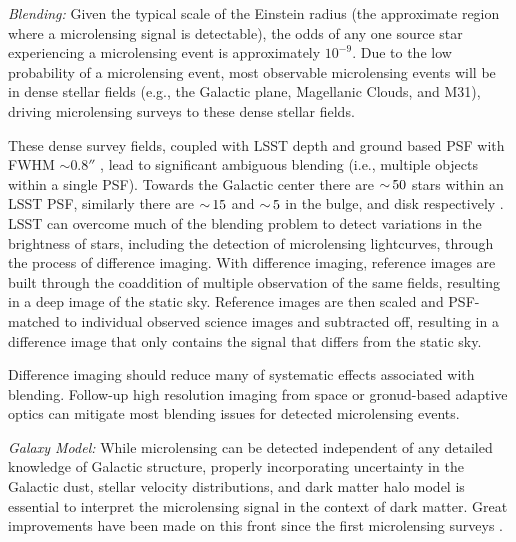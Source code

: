\emph{Blending:} Given the typical scale  of the Einstein radius (the approximate region where a microlensing signal is detectable), the odds of any one source star experiencing a microlensing event is approximately $10^{-9}$. Due to the low probability of a microlensing event, most observable microlensing events will be in dense stellar fields (e.g., the Galactic plane, Magellanic Clouds, and M31), driving microlensing surveys to these dense stellar fields.

These dense survey fields, coupled with LSST depth and ground based PSF with FWHM $\sim 0.8''$ \citep{0805.2366}, lead to significant ambiguous blending (i.e., multiple objects within a single PSF).
Towards the Galactic center there are $ {\sim}\, 50$ stars within an LSST PSF, similarly there are $ {\sim}\, 15$ and $ {\sim}\, 5$ in the bulge, and disk respectively \citep{1806.06372}.
LSST can overcome much of the blending problem to detect variations in the brightness of stars, including the detection of microlensing lightcurves, through the process of difference imaging.
With difference imaging, reference images are built through the coaddition of multiple observation of the same fields, resulting in a deep image of the static sky. Reference images are then scaled and PSF-matched to individual observed science images and subtracted off, resulting in a difference image that only contains the signal that differs from the static sky. 

Difference imaging should reduce many of systematic effects associated with blending. Follow-up high resolution imaging from space or gronud-based adaptive optics can mitigate most blending issues for detected microlensing events.

\emph{Galaxy Model:} While microlensing can be detected independent of any detailed knowledge of Galactic structure, properly incorporating uncertainty in the Galactic dust, stellar velocity distributions, and dark matter halo model is essential to interpret the microlensing signal in the context of dark matter.
Great improvements have been made on this front since the first microlensing surveys \citep[e.g.,][]{2018MNRAS.479.2889C}.



